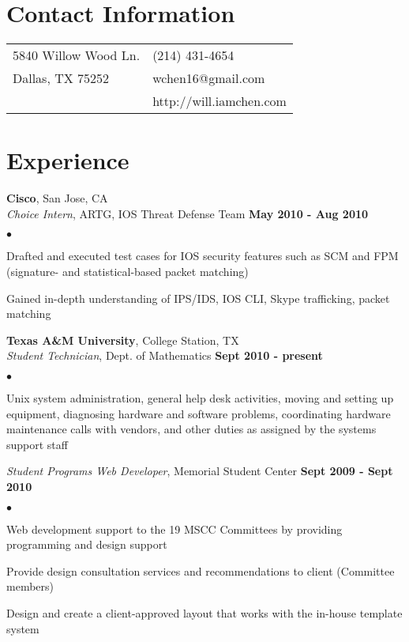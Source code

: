 \documentclass[margin,line]{res}
\newenvironment{list2}{
  \begin{list}{$\bullet$}{%
      \setlength{\itemsep}{0in}
      \setlength{\parsep}{0in} \setlength{\parskip}{0in}
      \setlength{\topsep}{0in} \setlength{\partopsep}{0in} 
      \setlength{\leftmargin}{0.2in}}}{\end{list}}
\begin{document}

\begin{resume}
\section{\sc Contact Information}
\vspace{.05in}
\begin{tabular}{@{}p{3in}p{4in}}
5840 Willow Wood Ln.        & (214) 431-4654 \\
Dallas, TX 75252            & wchen16@gmail.com \\
                            & http://will.iamchen.com \\
\end{tabular}


%
%
\section{\sc Experience}
{\bf Cisco}, San Jose, CA \\
{\em Choice Intern}, ARTG, IOS Threat Defense Team \hfill {\bf May 2010 - Aug 2010}\\
\vspace{-3mm}
\begin{list2}
\item Drafted and executed test cases for IOS security features such as SCM and FPM
  (signature- and statistical-based packet matching)
\item Gained in-depth understanding of IPS/IDS, IOS CLI, Skype trafficking, packet matching
\end{list2}

{\bf Texas A\&M University}, College Station, TX \\
{\em Student Technician}, Dept. of Mathematics \hfill {\bf Sept 2010 - present} \\
\vspace{-3mm}
\begin{list2}
\item Unix system administration, general help desk activities, moving and setting up equipment, diagnosing hardware and software problems, coordinating hardware maintenance calls with vendors, and other duties as assigned by the systems support staff
\end{list2}

{\em Student Programs Web Developer}, Memorial Student Center \hfill {\bf Sept 2009 - Sept 2010} \\
\vspace{-3mm}
\begin{list2}
\item Web development support to the 19 MSCC Committees by providing programming and design support
\item Provide design consultation services and recommendations to client (Committee members)
\item Design and create a client-approved layout that works with the in-house template system
\end{list2}


\end{resume}
\end{document}
